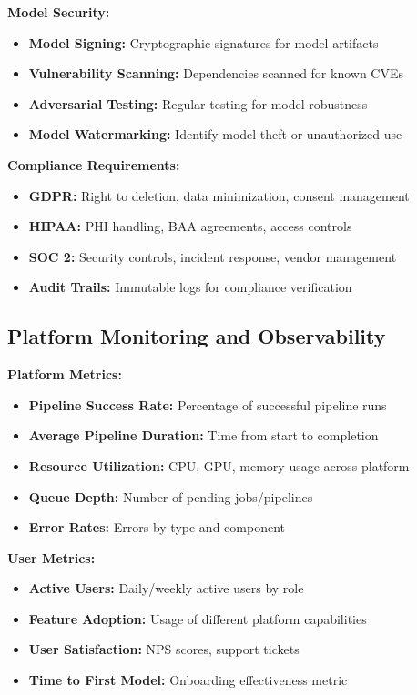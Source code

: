 \textbf{Model Security:}
\begin{itemize}
    \item \textbf{Model Signing:} Cryptographic signatures for model artifacts
    \item \textbf{Vulnerability Scanning:} Dependencies scanned for known CVEs
    \item \textbf{Adversarial Testing:} Regular testing for model robustness
    \item \textbf{Model Watermarking:} Identify model theft or unauthorized use
\end{itemize}

\textbf{Compliance Requirements:}
\begin{itemize}
    \item \textbf{GDPR:} Right to deletion, data minimization, consent management
    \item \textbf{HIPAA:} PHI handling, BAA agreements, access controls
    \item \textbf{SOC 2:} Security controls, incident response, vendor management
    \item \textbf{Audit Trails:} Immutable logs for compliance verification
\end{itemize}

\subsection{Platform Monitoring and Observability}

\textbf{Platform Metrics:}
\begin{itemize}
    \item \textbf{Pipeline Success Rate:} Percentage of successful pipeline runs
    \item \textbf{Average Pipeline Duration:} Time from start to completion
    \item \textbf{Resource Utilization:} CPU, GPU, memory usage across platform
    \item \textbf{Queue Depth:} Number of pending jobs/pipelines
    \item \textbf{Error Rates:} Errors by type and component
\end{itemize}

\textbf{User Metrics:}
\begin{itemize}
    \item \textbf{Active Users:} Daily/weekly active users by role
    \item \textbf{Feature Adoption:} Usage of different platform capabilities
    \item \textbf{User Satisfaction:} NPS scores, support tickets
    \item \textbf{Time to First Model:} Onboarding effectiveness metric
\end{itemize}

